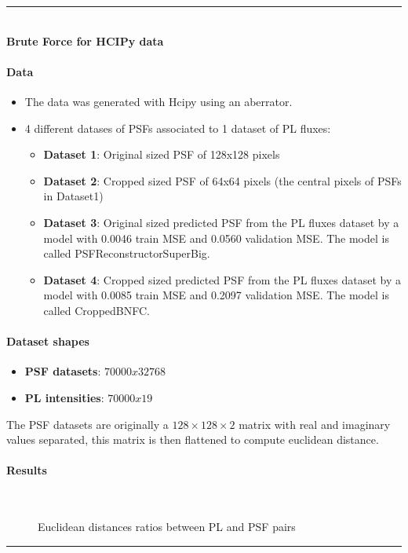 \rule{0.5\textwidth}{0.5pt}\\

	{\large \textbf{Brute Force for HCIPy data}}\\
	
	\paragraph{Data}
	\begin{itemize}
		\item The data was generated with Hcipy using an  aberrator.
		\item 4 different datases of PSFs associated to 1 dataset of PL fluxes:
		\begin{itemize}
			\item \textbf{Dataset 1}: Original sized PSF of 128x128 pixels
			\item \textbf{Dataset 2}: Cropped sized PSF of 64x64 pixels (the central pixels of PSFs in Dataset1)
			\item \textbf{Dataset 3}: Original sized predicted PSF from the PL fluxes dataset by a model with 0.0046 train MSE and 0.0560 validation MSE. The model is called PSFReconstructorSuperBig.
			\item \textbf{Dataset 4}: Cropped sized predicted PSF from the PL fluxes dataset by a model with 0.0085 train MSE and 0.2097 validation MSE. The model is called CroppedBNFC.
		\end{itemize}
	\end{itemize}
	
	\paragraph{Dataset shapes}
	\begin{itemize}
		\item \textbf{PSF datasets}: $70000x32768$ 
		\item \textbf{PL intensities}: $70000x19$
	\end{itemize}
	
	The PSF datasets are originally a $128\times128\times2$ matrix with real and imaginary values separated, this matrix is then flattened to compute euclidean distance.
	
	\paragraph{Results}
	
	\begin{figure*}[ht!]
		\centering
		\\
		\caption{Euclidean distances ratios between PL and PSF pairs}\hspace{\fill}
	\end{figure*}
	
\FloatBarrier	
\rule{0.5\textwidth}{0.5pt}\\